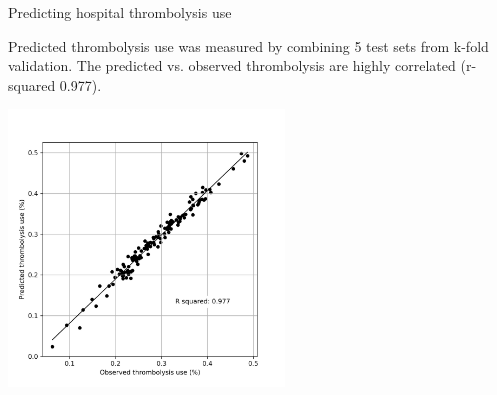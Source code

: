 \begin{frame}{Predicting hospital thrombolysis use}

Predicted thrombolysis use was measured by combining 5 test sets from k-fold validation. The predicted vs. observed thrombolysis are highly correlated (r-squared 0.977). 

\begin{center}
\includegraphics[width=0.55\textwidth]{./images/02_xgb_10_features_observed_predicted_rates.jpg}
\end{center}



\end{frame}